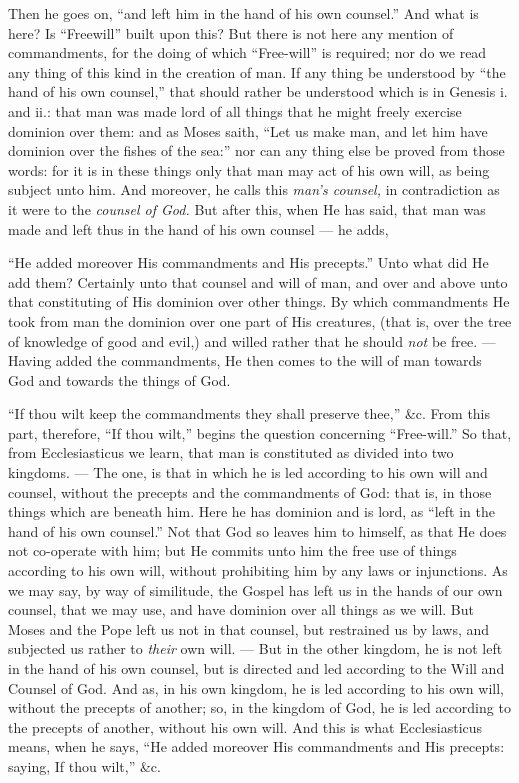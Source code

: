 Then he goes on, “and left him in the hand of his own counsel.” And what is here? Is “Freewill” built upon this? But there is not here any mention of commandments, for the doing of which “Free-will” is required; nor do we read any thing of this kind in the creation of man. If any thing be understood by “the hand of his own counsel,” that should rather be understood which is in Genesis i. and ii.: that man was made lord of all things that he might freely exercise dominion over them: and as Moses saith, “Let us make man, and let him have dominion over the fishes of the sea:” nor can any thing else be proved from those words: for it is in these things only that man may act of his own will, as being subject unto him. And moreover, he calls this \emph{man’s counsel, }in contradiction as it were to the \emph{counsel of God. }But after this, when He has said, that man was made and left thus in the hand of his own counsel — he adds,

“He added moreover His commandments and His precepts.” Unto what did He add them? Certainly unto that counsel and will of man, and over and above unto that constituting of His dominion over other things. By which commandments He took from man the dominion over one part of His creatures, (that is, over the tree of knowledge of good and evil,) and willed rather that he should \emph{not }be free. — Having added the commandments, He then comes to the will of man towards God and towards the things of God.

“If thou wilt keep the commandments they shall preserve thee,” \&c. From this part, therefore, “If thou wilt,” begins the question concerning “Free-will.” So that, from Ecclesiasticus we learn, that man is constituted as divided into two kingdoms. — The one, is that in which he is led according to his own will and counsel, without the precepts and the commandments of God: that is, in those things which are beneath him. Here he has dominion and is lord, as “left in the hand of his own counsel.” Not that God so leaves him to himself, as that He does not co-operate with him; but He commits unto him the free use of things according to his own will, without prohibiting him by any laws or injunctions. As we may say, by way of similitude, the Gospel has left us in the hands of our own counsel, that we may use, and have dominion over all things as we will. But Moses and the Pope left us not in that counsel, but restrained us by laws, and subjected us rather to \emph{their }own will. — But in the other kingdom, he is not left in the hand of his own counsel, but is directed and led according to the Will and Counsel of God. And as, in his own kingdom, he is led according to his own will, without the precepts of another; so, in the kingdom of God, he is led according to the precepts of another, without his own will. And this is what Ecclesiasticus means, when he says, “He added moreover His commandments and His precepts: saying, If thou wilt,” \&c.

